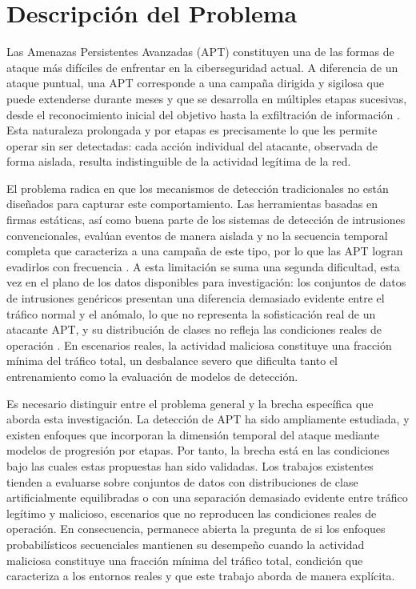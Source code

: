 \chapter{Descripción del Problema}

Las Amenazas Persistentes Avanzadas (APT) constituyen una de las formas de ataque más difíciles de enfrentar en la ciberseguridad actual. A diferencia de un ataque puntual, una APT corresponde a una campaña dirigida y sigilosa que puede extenderse durante meses y que se desarrolla en múltiples etapas sucesivas, desde el reconocimiento inicial del objetivo hasta la exfiltración de información \parencite{hutchins2011killchain}. Esta naturaleza prolongada y por etapas es precisamente lo que les permite operar sin ser detectadas: cada acción individual del atacante, observada de forma aislada, resulta indistinguible de la actividad legítima de la red.

El problema radica en que los mecanismos de detección tradicionales no están diseñados para capturar este comportamiento. Las herramientas basadas en firmas estáticas, así como buena parte de los sistemas de detección de intrusiones convencionales, evalúan eventos de manera aislada y no la secuencia temporal completa que caracteriza a una campaña de este tipo, por lo que las APT logran evadirlos con frecuencia \parencite{alshamrani2019survey}. A esta limitación se suma una segunda dificultad, esta vez en el plano de los datos disponibles para investigación: los conjuntos de datos de intrusiones genéricos presentan una diferencia demasiado evidente entre el tráfico normal y el anómalo, lo que no representa la sofisticación real de un atacante APT, y su distribución de clases no refleja las condiciones reales de operación \parencite{myneni2020dapt2020}. En escenarios reales, la actividad maliciosa constituye una fracción mínima del tráfico total, un desbalance severo que dificulta tanto el entrenamiento como la evaluación de modelos de detección.

Es necesario distinguir entre el problema general y la brecha específica que aborda esta investigación. La detección de APT ha sido ampliamente estudiada, y existen enfoques que incorporan la dimensión temporal del ataque mediante modelos de progresión por etapas. Por tanto, la brecha está en las condiciones bajo las cuales estas propuestas han sido validadas. Los trabajos existentes tienden a evaluarse sobre conjuntos de datos con distribuciones de clase artificialmente equilibradas o con una separación demasiado evidente entre tráfico legítimo y malicioso, escenarios que no reproducen las condiciones reales de operación. En consecuencia, permanece abierta la pregunta de si los enfoques probabilísticos secuenciales mantienen su desempeño cuando la actividad maliciosa constituye una fracción mínima del tráfico total, condición que caracteriza a los entornos reales y que este trabajo aborda de manera explícita.

